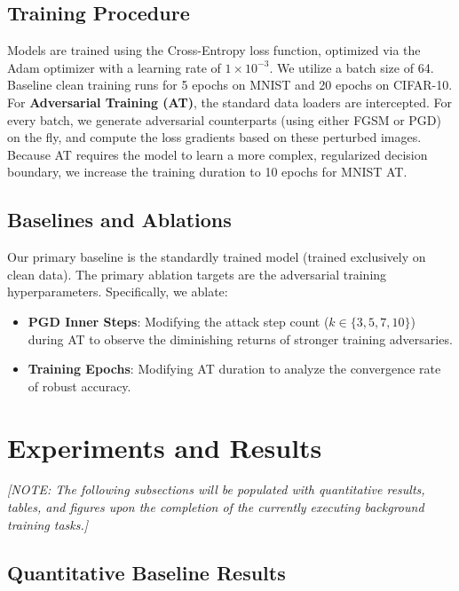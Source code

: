 \documentclass[conference,10pt]{IEEEtran}
\begin{document}
\subsection{Training Procedure}
Models are trained using the Cross-Entropy loss function, optimized via the Adam optimizer with a learning rate of $1 \times 10^{-3}$. We utilize a batch size of 64. Baseline clean training runs for 5 epochs on MNIST and 20 epochs on CIFAR-10.
For \textbf{Adversarial Training (AT)}, the standard data loaders are intercepted. For every batch, we generate adversarial counterparts (using either FGSM or PGD) on the fly, and compute the loss gradients based on these perturbed images. Because AT requires the model to learn a more complex, regularized decision boundary, we increase the training duration to 10 epochs for MNIST AT.

\subsection{Baselines and Ablations}
Our primary baseline is the standardly trained model (trained exclusively on clean data). The primary ablation targets are the adversarial training hyperparameters. Specifically, we ablate:
\begin{itemize}
    \item \textbf{PGD Inner Steps}: Modifying the attack step count ($k \in \{3, 5, 7, 10\}$) during AT to observe the diminishing returns of stronger training adversaries.
    \item \textbf{Training Epochs}: Modifying AT duration to analyze the convergence rate of robust accuracy.
\end{itemize}


\section{Experiments and Results}

\textit{[NOTE: The following subsections will be populated with quantitative results, tables, and figures upon the completion of the currently executing background training tasks.]}

\subsection{Quantitative Baseline Results}
\end{document}
